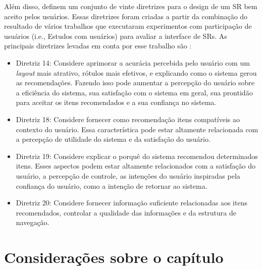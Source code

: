 Além disso,  definem um conjunto de vinte diretrizes para o design de um SR bem aceito
pelos usuários. Essas diretrizes foram criadas a partir da combinação do resultado de vários trabalhos que executaram
experimentos com participação de usuários (i.e., Estudos com usuários) para avaliar a interface de SRs. As principais
diretrizes levadas em conta por esse trabalho são \cite{pu2012evaluating}:

\begin{itemize}
\item Diretriz 14: Considere aprimorar a acurácia percebida pelo usuário com um \textit{layout} mais atrativo, rótulos mais
efetivos, e explicando como o sistema gerou as recomendações. Fazendo isso pode aumentar a percepção do usuário sobre a
eficiência do sistema, sua satisfação com o sistema em geral, sua prontidão para aceitar os itens recomendados e a sua
confiança no sistema.
\item Diretriz 18: Considere fornecer como recomendação itens compatíveis ao contexto do usuário. Essa característica
pode estar altamente relacionada com a percepção de utilidade do sistema e da satisfação do usuário.
\item Diretriz 19: Considere explicar o porquê do sistema recomendou determinados itens. Esses aspectos podem estar
altamente relacionados com a satisfação do usuário, a percepção de controle, as intenções do usuário inspiradas pela
confiança do usuário, como a intenção de retornar ao sistema.
\item Diretriz 20: Considere fornecer informação suficiente relacionadas aos itens recomendados, controlar a qualidade
das informações e da estrutura de navegação.
\end{itemize}

\section{Considerações sobre o capítulo}
